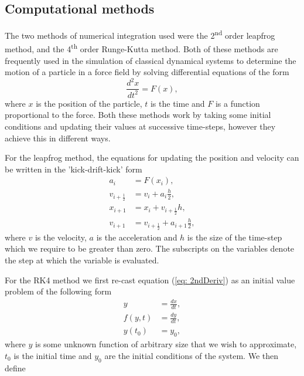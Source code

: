 \documentclass[12pt]{article} %
\numberwithin{equation}{subsection} %
\begin{document}
\subsection{Computational methods} \label{sec: Computational Methods}
The two methods of numerical integration used were the 2\textsuperscript{nd} order leapfrog method, and the 4\textsuperscript{th} order Runge-Kutta method. Both of these methods are frequently used in the simulation of classical dynamical systems to determine the motion of a particle in a force field by solving differential equations of the form
\begin{equation}
    \frac{d^{2}x}{dt^{2}}=F(x), \label{eq: 2ndDeriv}
\end{equation}
where $x$ is the position of the particle, $t$ is the time and $F$ is a function proportional to the force. Both these methods work by taking some initial conditions and updating their values at successive time-steps, however they achieve this in different ways. \par
For the leapfrog method, the equations for updating the position and velocity can be written in the 'kick-drift-kick' form \cite[p; 5]{dehnen2011n}
\begin{equation}
    \begin{aligned}
    a_{i}&=F(x_{i}), \\
    v_{i+\frac{1}{2}}&=v_{i}+a_{i}\frac{h}{2}, \\
    x_{i+1}&=x_{i}+v_{i+\frac{1}{2}}h, \\
    v_{i+1}&=v_{i+\frac{1}{2}}+a_{i+1}\frac{h}{2},
    \end{aligned}
\end{equation}
where $v$ is the velocity, $a$ is the acceleration and $h$ is the size of the time-step which we require to be greater than zero. The subscripts on the variables denote the step at which the variable is evaluated.  \par
For the RK4 method we first re-cast equation (\ref{eq: 2ndDeriv}) as an initial value problem of the following form
\begin{equation}
    \begin{aligned}
    y&=\frac{dx}{dt}, \\
    f(y,t)&=\frac{dy}{dt}, \\
    y(t_{0})&=y_{0},
    \end{aligned}
\end{equation}
where $y$ is some unknown function of arbitrary size that we wish to approximate, $t_{0}$ is the initial time and $y_0$ are the initial conditions of the system. We then define \cite[p; 328]{suli2003introduction}
\end{document}
